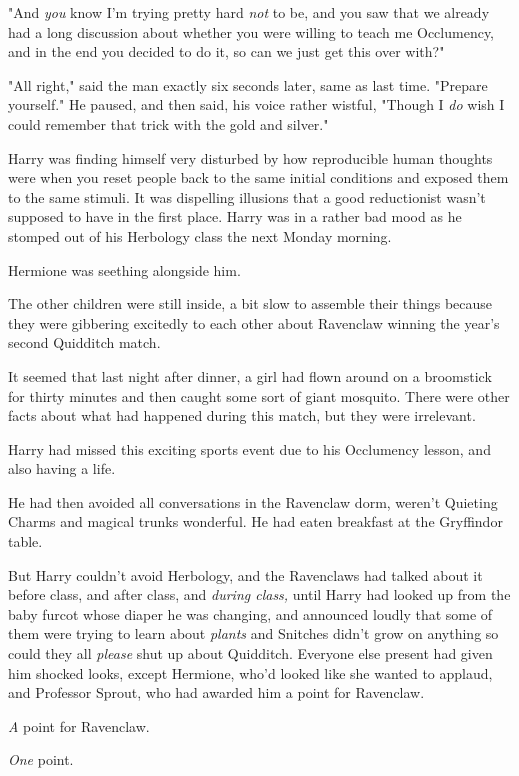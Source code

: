 "And \emph{you} know I'm trying pretty hard \emph{not} to be, and you saw that
we already had a long discussion about whether you were willing to teach me
Occlumency, and in the end you decided to do it, so can we just get this over
with?"

"All right," said the man exactly six seconds later, same as last time.
"Prepare yourself." He paused, and then said, his voice rather wistful, "Though
I \emph{do} wish I could remember that trick with the gold and silver."

Harry was finding himself very disturbed by how reproducible human thoughts
were when you reset people back to the same initial conditions and exposed them
to the same stimuli. It was dispelling illusions that a good reductionist
wasn't supposed to have in the first place.
\sbreak
Harry was in a rather bad mood as he stomped out of his Herbology class the
next Monday morning.

Hermione was seething alongside him.

The other children were still inside, a bit slow to assemble their things
because they were gibbering excitedly to each other about Ravenclaw winning the
year's second Quidditch match.

It seemed that last night after dinner, a girl had flown around on a broomstick
for thirty minutes and then caught some sort of giant mosquito. There were
other facts about what had happened during this match, but they were irrelevant.

Harry had missed this exciting sports event due to his Occlumency lesson, and
also having a life.

He had then avoided all conversations in the Ravenclaw dorm, weren't Quieting
Charms and magical trunks wonderful. He had eaten breakfast at the Gryffindor
table.

But Harry couldn't avoid Herbology, and the Ravenclaws had talked about it
before class, and after class, and \emph{during class,} until Harry had looked
up from the baby furcot whose diaper he was changing, and announced loudly that
some of them were trying to learn about \emph{plants} and Snitches didn't grow
on anything so could they all \emph{please} shut up about Quidditch. Everyone
else present had given him shocked looks, except Hermione, who'd looked like
she wanted to applaud, and Professor Sprout, who had awarded him a point for
Ravenclaw.

\emph{A} point for Ravenclaw.

\emph{One} point.

